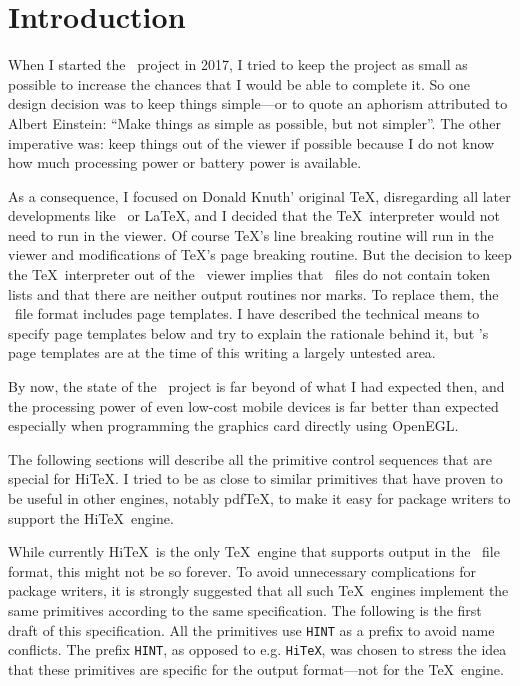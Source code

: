 \section{Introduction}
When I started the \HINT\ project in 2017,
I tried to keep the project as small as possible to increase the
chances that I would be able to complete it. So one design decision
was to keep things simple---or to quote an aphorism attributed to
Albert Einstein: ``Make things as simple as possible, but not simpler''.
The other imperative was:
keep things out of the viewer if possible because I do not know
how much processing power or battery power is available.

As a consequence, I focused on Donald Knuth' original \TeX,
disregarding all later developments like \eTeX\ or \LaTeX, and I
decided that the \TeX\ interpreter would not need to run in the
viewer.
Of course \TeX's line breaking routine will run in the viewer
and modifications of \TeX's page breaking routine. 
But the decision to keep the \TeX\ interpreter
out of the \HINT\ viewer implies that \HINT\ files do
not contain token lists and that there are
neither output routines nor marks.
To replace them, the \HINT\ file format includes
page templates. I have described the technical
means to specify page templates below and try to explain
the rationale behind it, but \HINT's page templates 
are at the time of this writing a largely untested area.

By now, the state of the \HINT\ project is far beyond of what
I had expected then, and the processing power of even low-cost
mobile devices is far better than expected especially when programming the
graphics card directly using OpenEGL.

The following sections will describe all the primitive control sequences
that are special for Hi\TeX. I tried to be as close to similar primitives
that have proven to be useful in other engines, notably pdf\TeX, to make
it easy for package writers to support the Hi\TeX\ engine.

While currently Hi\TeX\ is the only \TeX\ engine that supports output in the \HINT\ file
format, this might not be so forever. To avoid unnecessary complications for 
package writers, it is strongly suggested that all such \TeX\ engines implement
the same primitives according to the same specification. The following is the first
draft of this specification. All the primitives use {\tt HINT} as a prefix to
avoid name conflicts. The prefix {\tt HINT}, as opposed to e.g. {\tt HiTeX},
was chosen to stress the idea that these primitives are specific for the
output format---not for the \TeX\ engine. 

